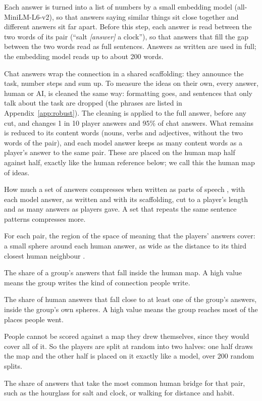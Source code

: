 \documentclass[11pt]{article}
\begin{document}
\begin{description}[leftmargin=0pt, itemsep=0.05em, parsep=0pt]
\item[\textbf{Space of meaning.}] Each answer is turned into a list of numbers by a small embedding model (all-MiniLM-L6-v2), so that answers saying similar things sit close together and different answers sit far apart. Before this step, each answer is read between the two words of its pair (``salt \emph{[answer]} a clock''), so that answers that fill the gap between the two words read as full sentences. Answers as written are used in full; the embedding model reads up to about 200 words.
\item[\textbf{Voice and ideas.}] Chat answers wrap the connection in a shared scaffolding: they announce the task, number steps and sum up. To measure the ideas on their own, every answer, human or AI, is cleaned the same way: formatting goes, and sentences that only talk about the task are dropped (the phrases are listed in Appendix~\ref{app:robust}). The cleaning is applied to the full answer, before any cut, and changes 1 in 10 player answers and 95\% of chat answers. What remains is reduced to its content words (nouns, verbs and adjectives, without the two words of the pair), and each model answer keeps as many content words as a player's answer to the same pair. These are placed on the human map half against half, exactly like the human reference below; we call this the human map of ideas.
\item[\textbf{Repetition of the voice.}] How much a set of answers compresses when written as parts of speech \citep{shaib2024}, with each model answer, as written and with its scaffolding, cut to a player's length and as many answers as players gave. A set that repeats the same sentence patterns compresses more.
\item[\textbf{The human map.}] For each pair, the region of the space of meaning that the players' answers cover: a small sphere around each human answer, as wide as the distance to its third closest human neighbour \citep{kynkaanniemi2019,lebronnec2024}.
\item[\textbf{Precision.}] The share of a group's answers that fall inside the human map. A high value means the group writes the kind of connection people write.
\item[\textbf{Recall.}] The share of human answers that fall close to at least one of the group's answers, inside the group's own spheres. A high value means the group reaches most of the places people went.
\item[\textbf{Human reference.}] People cannot be scored against a map they drew themselves, since they would cover all of it. So the players are split at random into two halves: one half draws the map and the other half is placed on it exactly like a model, over 200 random splits.
\item[\textbf{Hub rate.}] The share of answers that take the most common human bridge for that pair, such as the hourglass for salt and clock, or walking for distance and habit.
\end{description}
\end{document}
